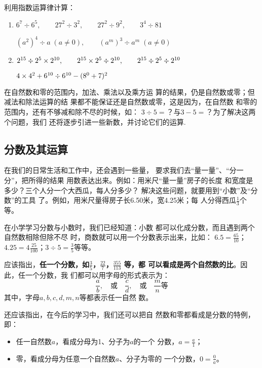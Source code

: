 \begin{ex}
利用指数运算律计算：
\begin{enumerate}
    \item $6^7\div 6^5,\qquad 27^2\div 3^2,\qquad 27^2\div 9^2,\qquad 3^4\div 81$
    
    $(a^2)^4\div a\; (a\ne 0),\qquad (a^m)^3\div a^m\; (a\ne 0)$
    \item $2^{15}\div 2^5\times 2^{10},\qquad 2^{15}\times 2^5\div 2^{10},\qquad 2^{15}\div 2^5\div 2^{10}$
    
    $4\times 4^2 +6^{10}\div 6^{10}-(8^0+7)^2$
\end{enumerate}
\end{ex}

在自然数和零的范围内，加法、乘法以及乘方运
算的结果，仍是自然数或零；但减法和除法运算的结
果都不能保证还是自然数或零，这是因为，在自然数
和零的范围内，还有不够减和除不尽的时候，如：
$3\div 5=$？与$3-5=$？为了解决这两个问题，我们
还将逐步引进一些新数，并讨论它们的运算.

\subsection{分数及其运算}

在我们的日常生活和工作中，还会遇到一些量，
要求我们去“量一量”、“分一分”，把所得的结果
用数表达出来。例如：用米尺“量一量”房子的长度
和宽度是多少？三个人分一个大西瓜，每人分多少？
解决这些问题，就要用到“小数”及“分数”的工具
了。例如，用米尺量得房子长6.50米，宽4.25米；每
人分得西瓜$\frac{1}{3}$个等。

在小学学习分数与小数时，我们已经知道：小数
都可以化成分数，而且遇到两个自然数相除但除不尽
时，商数就可以用一个分数表示出来，比如：
$6.5=\frac{65}{10}$；$4.25=4\frac{25}{100}$；$3\div 5=\frac{3}{5}$等等。

应该指出，\textbf{任一个分数，如$\frac{3}{5}$，$\frac{22}{7}$，$\frac{355}{113}$
等，都
可以看成是两个自然数的比}。因此，任一个分数，我
们都可以用字母的形式表示为：
\[\frac{a}{b},\quad \text{或}\quad \frac{c}{d}, \quad \text{或} \quad \frac{m}{n} \text{等} \]
其中，字母$a, b, c, d, m,n$等都表示任一自然
数。

    还应该指出，在今后的学习中，我们还可以把自
然数和零都看成是分数的特例，即：
\begin{itemize}
    \item 任一自然数$a$，看成分母为1、分子为$a$的一个
    分数，$a=\frac{a}{1}$；
    \item 零，看成分母为任意一个自然数$a$、分子为零的
    一个分数，$0=\frac{0}{a}$。
\end{itemize}

